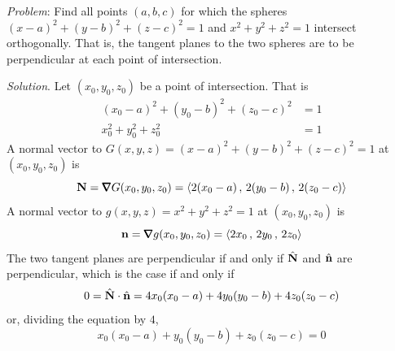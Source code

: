 \begin{eg}[Optional]\label{eg dir deriv F}
\noindent\textit{Problem}:
Find all points $(a,b,c)$ for which the spheres
$(x-a)^2+(y-b)^2+(z-c)^2 =1$ and $x^2+y^2+z^2=1$ intersect
orthogonally. That is, the tangent planes to the two spheres are 
to be perpendicular at each point of intersection.

\medskip
\noindent\textit{Solution}. Let $(x_0,y_0,z_0)$ be a point of intersection.
That is
\begin{align*}
(x_0-a)^2+(y_0-b)^2+(z_0-c)^2 & = 1 \\
x_0^2+y_0^2+z_0^2&=1
\end{align*}
A normal vector to $G(x,y,z)=(x-a)^2+(y-b)^2+(z-c)^2 =1$ at $(x_0,y_0,z_0)$
is
\begin{equation*}
\vN = \vnabla G(x_0,y_0,z_0) 
     = \llt 2(x_0-a)\,,\,2(y_0-b)\,,\,2(z_0-c)\rgt 
\end{equation*}
A normal vector to $g(x,y,z)=x^2+y^2+z^2 =1$ at $(x_0,y_0,z_0)$
is
\begin{equation*}
\vn = \vnabla g(x_0,y_0,z_0) 
     = \llt 2x_0\,,\,2y_0\,,\,2z_0\rgt 
\end{equation*}
The two tangent planes are perpendicular if and only if $\hat{\mathbf{N}}$ and $\hat{\mathbf{n}}$
are perpendicular, which is the case if and only if
\begin{equation*}
0=\hat{\mathbf{N}}\cdot\hat{\mathbf{n}} = 4x_0(x_0-a) + 4y_0(y_0-b) +4z_0(z_0-c)
\end{equation*}
or, dividing the equation by $4$,
\begin{equation*}
x_0(x_0-a) + y_0(y_0-b) +z_0(z_0-c)=0
\end{equation*}


\end{eg}
